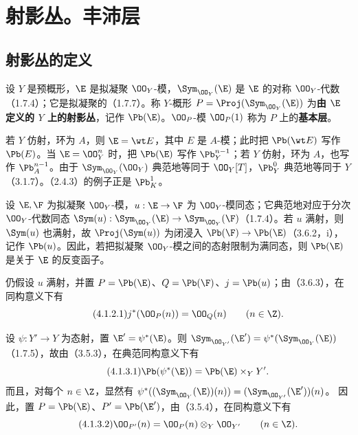 \section{射影丛。丰沛层}
\subsection{射影丛的定义}
设 $Y$ 是预概形，$\E$ 是拟凝聚 $\OO_Y$-模，$\Sym_{\OO_Y}(\E)$ 是 $\E$ 的对称 $\OO_Y$-代数（1.7.4）；它是拟凝聚的（1.7.7）。称 $Y$-概形
$P=\Proj(\Sym_{\OO_Y}(\E))$ 为\textbf{由 $\E$ 定义的 $Y$ 上的射影丛}，记作 $\Pb(\E)$。$\OO_P$-模 $\OO_P(1)$ 称为 $P$ 上的\textbf{基本层}。

若 $Y$ 仿射，环为 $A$，则 $\E=\wt E$，其中 $E$ 是 $A$-模；此时把 $\Pb(\wt E)$ 写作 $\Pb(E)$。当 $\E=\OO_Y^n$ 时，把 $\Pb(\E)$ 写作 $\Pb_Y^{n-1}$；若 $Y$ 仿射，环为 $A$，也写作 $\Pb_A^{n-1}$。由于 $\Sym_{\OO_Y}(\OO_Y)$ 典范地等同于 $\OO_Y[T]$，$\Pb_Y^0$ 典范地等同于 $Y$（3.1.7）。（2.4.3）的例子正是 $\Pb_K^1$。

设 $\E,\F$ 为拟凝聚 $\OO_Y$-模，$u:\E\to\F$ 为 $\OO_Y$-模同态；它典范地对应于分次 $\OO_Y$-代数同态
$\Sym(u):\Sym_{\OO_Y}(\E)\to\Sym_{\OO_Y}(\F)$（1.7.4）。若 $u$ 满射，则 $\Sym(u)$ 也满射，故 $\Proj(\Sym(u))$ 为闭浸入 $\Pb(\F)\to\Pb(\E)$（3.6.2，i），记作 $\Pb(u)$。因此，若把拟凝聚 $\OO_Y$-模之间的态射限制为满同态，则 $\Pb(\E)$ 是关于 $\E$ 的反变函子。

仍假设 $u$ 满射，并置 $P=\Pb(\E)$、$Q=\Pb(\F)$、$j=\Pb(u)$；由（3.6.3），在同构意义下有
\begin{equation}\tag{4.1.2.1}j^*(\OO_P(n))=\OO_Q(n)\qquad(n\in\Z).\end{equation}

设 $\psi:Y'\to Y$ 为态射，置 $\E'=\psi^*(\E)$。则
$\Sym_{\OO_{Y'}}(\E')=\psi^*(\Sym_{\OO_Y}(\E))$（1.7.5），故由（3.5.3），在典范同构意义下有
\begin{equation}\tag{4.1.3.1}\Pb(\psi^*(\E))=\Pb(\E)\times_Y Y'.\end{equation}
而且，对每个 $n\in\Z$，显然有
$\psi^*((\Sym_{\OO_Y}(\E))(n))=(\Sym_{\OO_{Y'}}(\E'))(n)$。
因此，置 $P=\Pb(\E)$、$P'=\Pb(\E')$，由（3.5.4），在同构意义下有
\begin{equation}\tag{4.1.3.2}\OO_{P'}(n)=\OO_P(n)\otimes_Y\OO_{Y'}\qquad(n\in\Z).\end{equation}

